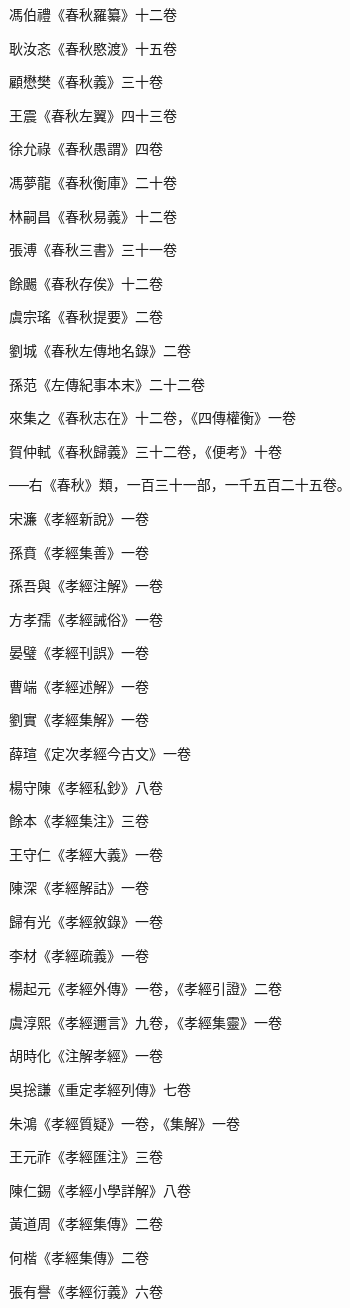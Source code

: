 馮伯禮《春秋羅纂》十二卷

耿汝忞《春秋愍渡》十五卷

顧懋樊《春秋義》三十卷

王震《春秋左翼》四十三卷

徐允祿《春秋愚謂》四卷

馮夢龍《春秋衡庫》二十卷

林嗣昌《春秋易義》十二卷

張溥《春秋三書》三十一卷

餘颺《春秋存俟》十二卷

虞宗瑤《春秋提要》二卷

劉城《春秋左傳地名錄》二卷

孫范《左傳紀事本末》二十二卷

來集之《春秋志在》十二卷，《四傳權衡》一卷

賀仲軾《春秋歸義》三十二卷，《便考》十卷

──右《春秋》類，一百三十一部，一千五百二十五卷。

宋濂《孝經新說》一卷

孫賁《孝經集善》一卷

孫吾與《孝經注解》一卷

方孝孺《孝經誡俗》一卷

晏璧《孝經刊誤》一卷

曹端《孝經述解》一卷

劉實《孝經集解》一卷

薛瑄《定次孝經今古文》一卷

楊守陳《孝經私鈔》八卷

餘本《孝經集注》三卷

王守仁《孝經大義》一卷

陳深《孝經解詁》一卷

歸有光《孝經敘錄》一卷

李材《孝經疏義》一卷

楊起元《孝經外傳》一卷，《孝經引證》二卷

虞淳熙《孝經邇言》九卷，《孝經集靈》一卷

胡時化《注解孝經》一卷

吳捴謙《重定孝經列傳》七卷

朱鴻《孝經質疑》一卷，《集解》一卷

王元祚《孝經匯注》三卷

陳仁錫《孝經小學詳解》八卷

黃道周《孝經集傳》二卷

何楷《孝經集傳》二卷

張有譽《孝經衍義》六卷

